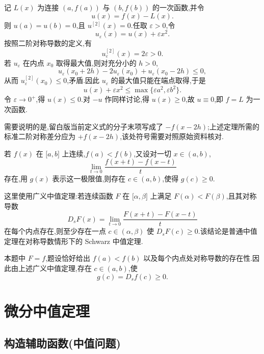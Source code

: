 \begin{solution}
    记 $L(x)$ 为连接 $(a,f(a))$ 与 $(b,f(b))$ 的一次函数,并令
    \[
        u(x)=f(x)-L(x).
    \]
    则 $u(a)=u(b)=0$,且 $u^{[2]}(x)=0$.任取 $\varepsilon>0$,令
    \[
        u_{\varepsilon}(x)=u(x)+\varepsilon x^2.
    \]
    按照二阶对称导数的定义,有
    \[
        u_{\varepsilon}^{[2]}(x)=2\varepsilon>0.
    \]
    若 $u_{\varepsilon}$ 在内点 $x_0$ 取得最大值,则对充分小的 $h>0$,
    \[
        u_{\varepsilon}(x_0+2h)-2u_{\varepsilon}(x_0)
        +u_{\varepsilon}(x_0-2h)\leq0,
    \]
    从而 $u_{\varepsilon}^{[2]}(x_0)\leq0$,矛盾.因此 $u_{\varepsilon}$ 的最大值只能在端点取得,于是
    \[
        u(x)+\varepsilon x^2
        \leq\max\{\varepsilon a^2,\varepsilon b^2\}.
    \]
    令 $\varepsilon\to0^+$,得 $u(x)\leq0$.对 $-u$ 作同样讨论,得 $u(x)\geq0$,故 $u\equiv0$,即 $f=L$ 为一次函数.

    需要说明的是,留白版当前定义式的分子末项写成了 $-f(x-2h)$;上述定理所需的标准二阶对称差分应为 $+f(x-2h)$,该处符号需要对照原始资料核对.
\end{solution}

\begin{example}
    若 $f(x)$ 在 $\lbrack a,b\rbrack$ 上连续,$f(a)<f(b)$,又设对一切 $x\in(a,b)$,
    \[
        \displaystyle\lim\limits_{t\to0}\dfrac{f(x+t)-f(x-t)}{t}
    \]
    存在,用 $g(x)$ 表示这一极限值,则存在 $c\in(a,b)$,使得 $g(c)\geq0$.
\end{example}
\exampleblank

\begin{solution}
    这里使用广义中值定理:若连续函数 $F$ 在 $\lbrack\alpha,\beta\rbrack$ 上满足 $F(\alpha)<F(\beta)$,且其对称导数
    \[
        D_sF(x)=\lim\limits_{t\to0}\dfrac{F(x+t)-F(x-t)}{t}
    \]
    在每个内点存在,则至少存在一点 $c\in(\alpha,\beta)$ 使 $D_sF(c)\geq0$.该结论是普通中值定理在对称导数情形下的 Schwarz 中值定理.

    本题中 $F=f$,题设恰好给出 $f(a)<f(b)$ 以及每个内点处对称导数的存在性.因此由上述广义中值定理,存在 $c\in(a,b)$,使
    \[
        g(c)=D_sf(c)\geq0.
    \]
\end{solution}


\newpage

\section{微分中值定理}


\subsection{构造辅助函数(中值问题)}

